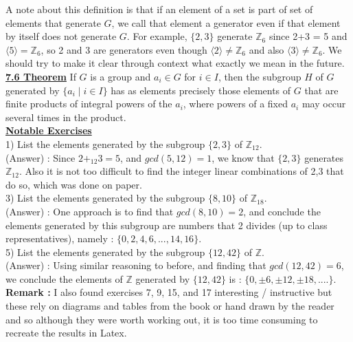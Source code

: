 \documentclass[12pt, letterpaper]{article}
\begin{document}
A note about this definition is that if an element of a set is part of set of elements that generate $G$, we call that element a generator even if that element by itself does not generate $G$. For example, $\{2,3\}$ generate $\mathbb{Z}_6$ since 2+3 = 5 and $\langle 5 \rangle = \mathbb{Z}_6$, so 2 and 3 are generators even though $\langle 2 \rangle \neq \mathbb{Z}_6$ and also $\langle 3 \rangle \neq \mathbb{Z}_6$. We should try to make it clear through context what exactly we mean in the future. \\

\noindent \underline{\bf 7.6 Theorem} If $G$ is a group and $a_i \in G$ for $i \in I$, then the subgroup $H$ of $G$ generated by $\{a_i \; | \; i \in I\}$ has as elements precisely those elements of $G$ that are finite products of integral powers of the $a_i$, where powers of a fixed $a_i$ may occur several times in the product. \\

\noindent \underline{\bf Notable Exercises} \\

1) List the elements generated by the subgroup $\{2,3\}$ of $\mathbb{Z}_12$. \\

(Answer) : Since $2 +_{12} 3 = 5$, and $gcd(5,12) = 1$, we know that $\{2,3\}$ generates $\mathbb{Z}_12$. Also it is not too difficult to find the integer linear combinations of 2,3 that do so, which was done on paper. \\

3) List the elements generated by the subgroup $\{8,10\}$ of $\mathbb{Z}_18$. \\

(Answer) : One approach is to find that $gcd(8,10) = 2$, and conclude the elements generated by this subgroup are numbers that 2 divides (up to class representatives), namely : $\{0,2,4,6,...,14,16\}$. \\

5) List the elements generated by the subgroup $\{12,42\}$ of $\mathbb{Z}$. \\

(Answer) : Using similar reasoning to before, and finding that $gcd(12,42) = 6$, we conclude the elements of $\mathbb{Z}$ generated by $\{12,42\}$ is : $\{0,\pm 6, \pm 12, \pm 18, .... \}$. \\

{\bf Remark :} I also found exercises 7, 9, 15, and 17 interesting / instructive but these rely on diagrams and tables from the book or hand drawn by the reader and so although they were worth working out, it is too time consuming to recreate the results in Latex.
\end{document}
